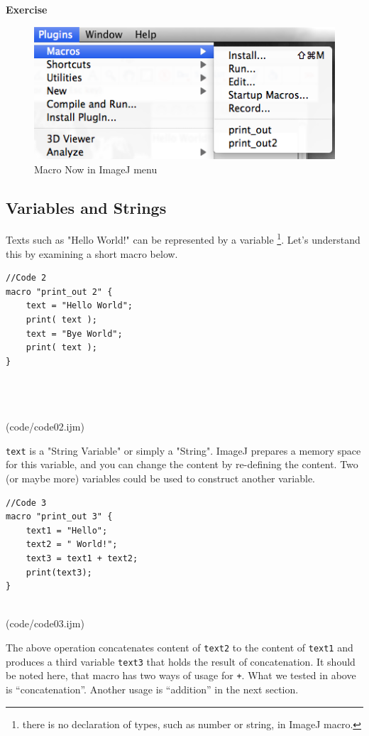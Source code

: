 \documentclass[11pt,a4paper,oneside]{report}
\newenvironment{indentexercise}[1]
{{\setlength{\leftmargin}{2em}}
\textbf{Exercise \thesubsection-#1}
\begin{list}{}
	\item
}
{\end{list}}
\newcommand{\ilcom}[1]{\texttt{\small#1}}
\begin{document}
\begin{indentexercise}{3}
\begin{figure}[htbp]
\begin{center}
\includegraphics[scale=0.6]{fig/firstMacroSetInMenu.png}
\caption{Macro Now in ImageJ menu} \label{fig_MacroInMenu}
\end{center}
\end{figure}
\end{indentexercise}
   \subsection{Variables and Strings}
Texts such as "Hello World!" can be represented by a variable 
\footnote{there is no declaration of types, such as number or string, in ImageJ macro.}.
Let's understand this by examining a short macro below.

\begin{lstlisting}
//Code 2
macro "print_out 2" {
	text = "Hello World";
	print( text );
	text = "Bye World";
	print( text );
}




\end{lstlisting}
(code/code02.ijm)

\ilcom{text} is a "String Variable" or simply a "String". 
ImageJ prepares a memory space for this variable, and you can change the content by re-defining the content. Two (or maybe more) variables could be used to construct another variable. 


\begin{lstlisting}
//Code 3
macro "print_out 3" {
	text1 = "Hello";
	text2 = " World!";
	text3 = text1 + text2;
	print(text3);
}


\end{lstlisting}
(code/code03.ijm)

The above operation concatenates content of \ilcom{text2} to the content of \ilcom{text1} and produces a third variable \ilcom{text3} that holds the result of concatenation. It should be noted here, that macro has two ways of usage for \ilcom{+}. What we tested in above is ``concatenation''. Another usage is ``addition'' in the next section. 
\end{document}
